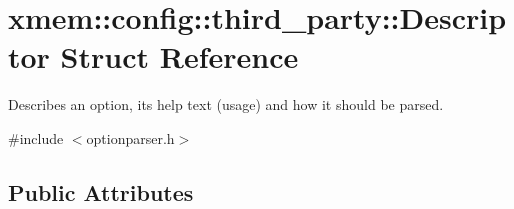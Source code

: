\hypertarget{structxmem_1_1config_1_1third__party_1_1_descriptor}{\section{xmem\-:\-:config\-:\-:third\-\_\-party\-:\-:Descriptor Struct Reference}
\label{structxmem_1_1config_1_1third__party_1_1_descriptor}
}


Describes an option, its help text (usage) and how it should be parsed.  




{\ttfamily \#include $<$optionparser.\-h$>$}

\subsection*{Public Attributes}
